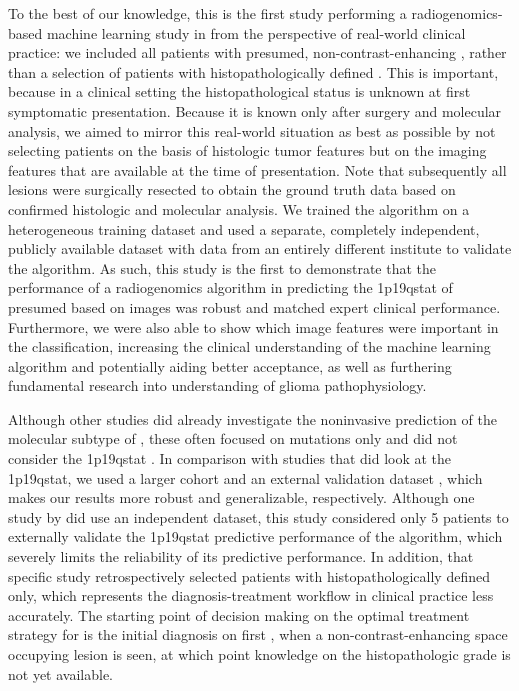 To the best of our knowledge, this is the first study performing a radiogenomics-based machine learning study in  from the perspective of real-world clinical practice: we included all patients with presumed, non-contrast-enhancing , rather than a selection of patients with histopathologically defined .
This is important, because in a clinical setting the histopathological status is unknown at first symptomatic presentation.
Because it is known only after surgery and molecular analysis, we aimed to mirror this real-world situation as best as possible by not selecting patients on the basis of histologic \gls{tumor} features but on the imaging features that are available at the time of presentation.
Note that subsequently all lesions were surgically resected to obtain the ground truth data based on confirmed histologic and molecular analysis.
We trained the algorithm on a heterogeneous training dataset and used a separate, completely independent, publicly available dataset with data from an entirely different institute to validate the algorithm.
As such, this study is the first to demonstrate that the performance of a radiogenomics algorithm in predicting the \acl{1p19qstat} of presumed  based on  images was robust and matched expert clinical performance.
Furthermore, we were also able to show which image features were important in the classification, increasing the clinical understanding of the machine learning algorithm and potentially aiding better acceptance, as well as furthering fundamental research into understanding of glioma pathophysiology.

Although other studies did already investigate the noninvasive prediction of the molecular subtype of , these often focused on  mutations only and did not consider the \acl{1p19qstat} \autocite{li2017deep, ren2019noninvasive, yu2017noninvasive}.
In comparison with studies that did look at the \acl{1p19qstat}, we used a larger cohort and an external validation dataset \autocite{akkus2017predicting, chang2018deep, han2018non, park2018prediction, shofty2018mri}, which makes our results more robust and generalizable, respectively.
Although one study by  did use an independent dataset, this study considered only 5 patients to externally validate the \acl{1p19qstat} predictive performance of the algorithm, which severely limits the reliability of its predictive performance.
In addition, that specific study retrospectively selected patients with histopathologically defined  only, which represents the diagnosis-treatment workflow in clinical practice less accurately.
The starting point of decision making on the optimal treatment strategy for  is the initial diagnosis on first , when a non-contrast-enhancing space occupying lesion is seen, at which point knowledge on the histopathologic grade is not yet available.

